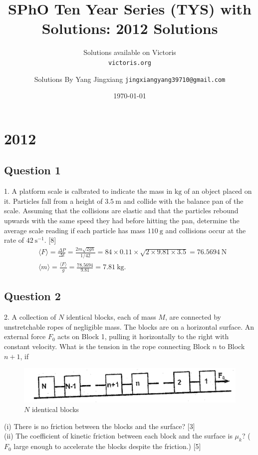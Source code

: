 \documentclass{article}
\title{SPhO Ten Year Series (TYS) with Solutions: 2012 Solutions}
\author{
    Solutions available on Victoris\\
    \texttt{victoris.org}
    \and 
    Solutions By Yang Jingxiang
    \texttt{jingxiangyang39710@gmail.com}
}
\date{\today}
\begin{document}
\maketitle

\section{2012}

\subsection{Question 1}
1. A platform scale is calbrated to indicate the mass in $\mathrm{kg}$ of an object placed on it. Particles fall from a height of $3.5 \mathrm{~m}$ and collide with the balance pan of the scale. Assuming that the collisions are elastic and that the particles rebound upwards with the same speed they had before hitting the pan, determine the average scale reading if each particle has mass $110 \mathrm{~g}$ and collisions occur at the rate of $42 \mathrm{~s}^{-1}$. [8] \\

$$
\begin{aligned}
& \langle F\rangle=\frac{\Delta P}{\Delta t}=\frac{2 m \sqrt{2 g h}}{1 / 42}=84 \times 0.11 \times \sqrt{2 \times 9.81 \times 3.5}=76.5694 \mathrm{~N} \\
& \langle m\rangle=\frac{\langle F\rangle}{g}=\frac{78.5694}{9.81}=7.81 \mathrm{~kg} .
\end{aligned}
$$
\subsection{Question 2}
2. A collection of $N$ identical blocks, each of mass $M$, are connected by unstretchable ropes of negligible mass. The blocks are on a horizontal surface. An external force $F_{0}$ acts on Block 1, pulling it horizontally to the right with constant velocity. What is the tension in the rope connecting Block $n$ to Block $n+1$, if
\begin{figure}
	\centering
	\includegraphics[width=0.7\linewidth]{spho_book_TYS_images/2012q1.png}
	\caption{$N$ identical blocks}
\end{figure}
(i) There is no friction between the blocks and the surface? [3] \\
(ii) The coefficient of kinetic friction between each block and the surface is $\mu_{k}$? ( $F_{0}$ large enough to accelerate the blocks despite the friction.) [5] \\
\end{document}
